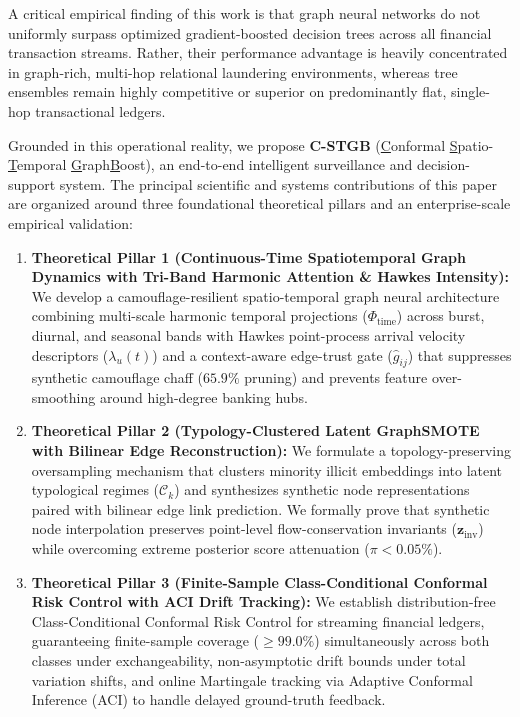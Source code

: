 A critical empirical finding of this work is that graph neural networks do not uniformly surpass optimized gradient-boosted decision trees across all financial transaction streams. Rather, their performance advantage is heavily concentrated in graph-rich, multi-hop relational laundering environments, whereas tree ensembles remain highly competitive or superior on predominantly flat, single-hop transactional ledgers.

Grounded in this operational reality, we propose \textbf{C-STGB} (\underline{C}onformal \underline{S}patio-\underline{T}emporal \underline{G}raph\underline{B}oost), an end-to-end intelligent surveillance and decision-support system. The principal scientific and systems contributions of this paper are organized around three foundational theoretical pillars and an enterprise-scale empirical validation:
\begin{enumerate}
    \item \textbf{Theoretical Pillar 1 (Continuous-Time Spatiotemporal Graph Dynamics with Tri-Band Harmonic Attention \& Hawkes Intensity):} We develop a camouflage-resilient spatio-temporal graph neural architecture combining multi-scale harmonic temporal projections ($\Phi_{\text{time}}$) across burst, diurnal, and seasonal bands with Hawkes point-process arrival velocity descriptors ($\lambda_u(t)$) and a context-aware edge-trust gate ($\hat{g}_{ij}$) that suppresses synthetic camouflage chaff ($65.9\%$ pruning) and prevents feature over-smoothing around high-degree banking hubs.
    \item \textbf{Theoretical Pillar 2 (Typology-Clustered Latent GraphSMOTE with Bilinear Edge Reconstruction):} We formulate a topology-preserving oversampling mechanism that clusters minority illicit embeddings into latent typological regimes ($\mathcal{C}_k$) and synthesizes synthetic node representations paired with bilinear edge link prediction. We formally prove that synthetic node interpolation preserves point-level flow-conservation invariants ($\mathbf{z}_{\text{inv}}$) while overcoming extreme posterior score attenuation ($\pi < 0.05\%$).
    \item \textbf{Theoretical Pillar 3 (Finite-Sample Class-Conditional Conformal Risk Control with ACI Drift Tracking):} We establish distribution-free Class-Conditional Conformal Risk Control for streaming financial ledgers, guaranteeing finite-sample coverage ($\ge 99.0\%$) simultaneously across both classes under exchangeability, non-asymptotic drift bounds under total variation shifts, and online Martingale tracking via Adaptive Conformal Inference (ACI) to handle delayed ground-truth feedback.

\end{enumerate}
